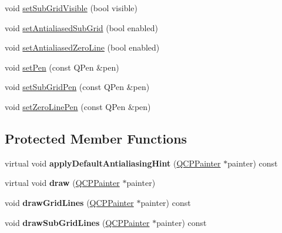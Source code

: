 \begin{DoxyCompactItemize}
\item 
void \hyperlink{classQCPGrid_ad4ad6bf714ec45e08845456355a1b700}{set\+Sub\+Grid\+Visible} (bool visible)
\item 
void \hyperlink{classQCPGrid_a5692310ba183721a413d60951407d114}{set\+Antialiased\+Sub\+Grid} (bool enabled)
\item 
void \hyperlink{classQCPGrid_a3cc6d54647393ee71afb6da56af07aa4}{set\+Antialiased\+Zero\+Line} (bool enabled)
\item 
void \hyperlink{classQCPGrid_aa05ab9816ffb440908171e45e833b593}{set\+Pen} (const Q\+Pen \&pen)
\item 
void \hyperlink{classQCPGrid_a9edd3593f384d1f0b0202a39cef4453d}{set\+Sub\+Grid\+Pen} (const Q\+Pen \&pen)
\item 
void \hyperlink{classQCPGrid_a209f40fdb252397b418b82d3494d8ea0}{set\+Zero\+Line\+Pen} (const Q\+Pen \&pen)
\end{DoxyCompactItemize}
\subsection*{Protected Member Functions}
\begin{DoxyCompactItemize}
\item 
virtual void {\bfseries apply\+Default\+Antialiasing\+Hint} (\hyperlink{classQCPPainter}{Q\+C\+P\+Painter} $\ast$painter) const \hypertarget{classQCPGrid_a9916f5e38b4d6cae446537aeb47c7272}{}\label{classQCPGrid_a9916f5e38b4d6cae446537aeb47c7272}

\item 
virtual void {\bfseries draw} (\hyperlink{classQCPPainter}{Q\+C\+P\+Painter} $\ast$painter)\hypertarget{classQCPGrid_ad009c23f96078616aa4f66a750974b23}{}\label{classQCPGrid_ad009c23f96078616aa4f66a750974b23}

\item 
void {\bfseries draw\+Grid\+Lines} (\hyperlink{classQCPPainter}{Q\+C\+P\+Painter} $\ast$painter) const \hypertarget{classQCPGrid_a3aff10e993f6625e255c19e4f97a09d8}{}\label{classQCPGrid_a3aff10e993f6625e255c19e4f97a09d8}

\item 
void {\bfseries draw\+Sub\+Grid\+Lines} (\hyperlink{classQCPPainter}{Q\+C\+P\+Painter} $\ast$painter) const \hypertarget{classQCPGrid_afa5d9d12de419e881f381f2ab7cb414d}{}\label{classQCPGrid_afa5d9d12de419e881f381f2ab7cb414d}

\end{DoxyCompactItemize}
